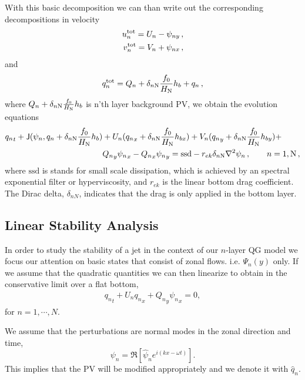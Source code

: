 \documentclass[11pt]{article}
\newcommand{\ssd}{\text{ssd}}
\newcommand{\tot}{\text{tot}}
\begin{document}
With this basic decomposition we can than write out the corresponding decompositions in velocity
\begin{align}
\label{eq:Uequiv}
u_n^{{\tot}} = U_n - \psi_{n y}\com \nonumber \\
v_n^{\tot} = V_n + \psi_{n x} \com
\end{align}
and
\begin{equation}
q_n^{\tot} = Q_n + \delta_{n\nmax}\frac{f_0}{H_\nmax}h_b + q_n \com
\end{equation}
where $Q_n + \delta_{n\mathrm{N}}\frac{f_0}{H_{\mathrm{N}}}h_b$ is n'th layer background PV,
we obtain the evolution equations
\begin{align}
\label{eq:qg_dynamics}
{q_n}_t + \mathsf{J}(\psi_n,q_n + \delta_{n \nmax} \frac{f_0}{H_\nmax}h_b )& + U_n ({q_n}_x + \delta_{n \nmax} \frac{f_0}{H_\nmax}h_{bx}) + V_n ({q_n}_y + \delta_{n \nmax} \frac{f_0}{H_\nmax}h_{by})+ \nonumber
\\ & {Q_n}_y {\psi_n}_x - {Q_n}_x {\psi_n}_y = \ssd
- r_{ek} \delta_{n\nmax} \lap \psi_n \com \qquad n = 1,\nmax\com
\end{align}
where $\ssd$ is 
stands for small scale dissipation, which is achieved by an spectral exponential filter
or hyperviscosity, and $r_{ek}$ is the linear bottom drag coefficient. The Dirac delta,
$\delta_{nN}$, indicates that the drag is only applied in the bottom layer.


\subsection*{Linear Stability Analysis}

In order to study the stability of a jet in the context of our $n$-layer QG model we focus our attention on basic states that consist of zonal flows. i.e. $\Psi_n(y)$ only.  If we assume that the quadratic quantities  we can then linearize to obtain in the conservative limit over a flat bottom,
\begin{align}
\label{eq:qglin_dynamics}
{q_n}_t  + U_n {q_n}_x + {Q_n}_y {\psi_n}_x  = 0,
\end{align}
for $n = 1, \cdots, N$.

We assume that the perturbations are normal modes in the zonal direction and time,
$$
\psi_n  = \Re[ \hat \psi_n e^{i(kx - \omega t)} ].
$$
This implies that the PV will be modified appropriately and we denote it with $\hat q_n$.
\end{document}

